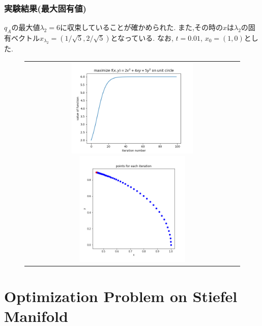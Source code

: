 \documentclass[dvipdfmx,11pt]{beamer}		%
\begin{document}
    \begin{frame}
        \frametitle{実験結果(最大固有値)}
        $q_{A}$の最大値$\lambda_2 = 6$に収束していることが確かめられた.
        また,その時の$x$は$\lambda_2$の固有ベクトル$x_{\lambda_2} = (1/\sqrt{5}, 2/\sqrt{5})$となっている.
        なお, $t = 0.01$, $x_{0} = (1, 0)$とした. 
        \begin{figure}[b]
            \begin{tabular}{c}
                \begin{minipage}{0.55\hsize}
                    \centering
                    \includegraphics[width = 6.3cm]{Images/result_max.png}
                \end{minipage}
                \begin{minipage}{0.45\hsize}
                    \centering
                    \includegraphics[width = 5.5cm]{Images/eign_vec_max.png}
                \end{minipage}
            \end{tabular}   
        \end{figure}  
    \end{frame}
\section{Optimization Problem on Stiefel Manifold}
\end{document}
